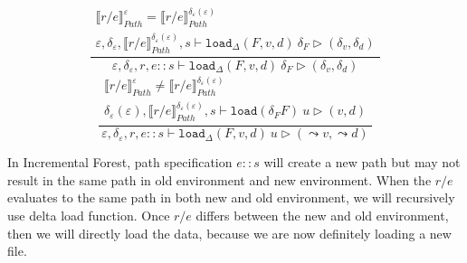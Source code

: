 \documentclass[10pt,twoside,a4paper]{article}
\theoremstyle{theorem}
\theoremstyle{lemma}
\theoremstyle{property}
\theoremstyle{definition}
\theoremstyle{assumption}
\begin{document}
\begin{displaymath}
	\frac{\begin{array}{c}
		\llbracket r/e \rrbracket^{\varepsilon}_{Path} = \llbracket r/e \rrbracket^{\delta_\varepsilon(\varepsilon)}_{Path}\\
		\varepsilon, \delta_\varepsilon, \llbracket r/e \rrbracket^{\delta_\varepsilon(\varepsilon)}_{Path}, s \vdash \mathtt{load}_\Delta (F,v,d)~ \delta_F \rhd (\delta_v,\delta_d)
	\end{array}}
	{
		\varepsilon, \delta_\varepsilon, r, e::s \vdash \mathtt{load}_\Delta (F,v,d)~ \delta_F \rhd (\delta_v,\delta_d)
	}
\end{displaymath}
\begin{displaymath}
	\frac{\begin{array}{c}
		\llbracket r/e \rrbracket^{\varepsilon}_{Path} \not= \llbracket r/e \rrbracket^{\delta_\varepsilon(\varepsilon)}_{Path}\\
		\delta_\varepsilon(\varepsilon), \llbracket r/e \rrbracket^{\delta_\varepsilon(\varepsilon)}_{Path} , s \vdash \mathtt{load}(\delta_F F)~ u \rhd (v,d)
	\end{array}}
	{
		\varepsilon, \delta_\varepsilon, r, e::s \vdash \mathtt{load}_\Delta (F,v,d)~ u \rhd (\leadsto v,\leadsto d)
	}
\end{displaymath}

In Incremental Forest, path specification $e\!::\!s$ will create a new path but may not result in the same path in old environment and new environment. 
When the $r/e$ evaluates to the same path in both new and old environment, we will recursively use delta load function.
Once $r/e$ differs between the new and old environment, then we will directly load the data, because we are now  definitely loading a new file. \\
\end{document}
